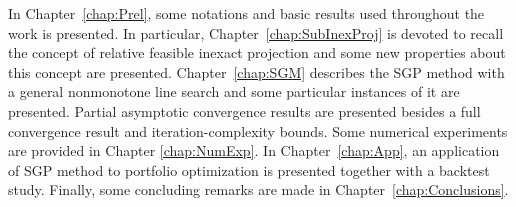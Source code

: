 In Chapter~\ref{chap:Prel}, some notations and basic results used throughout the work is presented. In particular, Chapter~\ref{chap:SubInexProj} is devoted to recall the concept of relative feasible inexact projection and some  new properties about this concept are presented. Chapter~\ref{chap:SGM}  describes the SGP method with a general nonmonotone line search and some particular instances of it are presented.  Partial asymptotic convergence results  are presented besides a full   convergence result  and iteration-complexity bounds. Some numerical experiments are provided in Chapter \ref{chap:NumExp}. In Chapter~\ref{chap:App}, an application of SGP method to portfolio optimization is presented together with a backtest study. Finally, some concluding remarks are made in Chapter~\ref{chap:Conclusions}.
